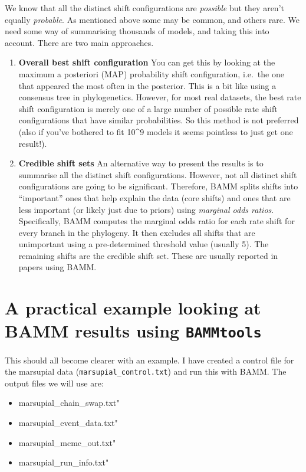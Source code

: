 \documentclass[]{book}
\providecommand{\tightlist}{%
  \setlength{\itemsep}{0pt}\setlength{\parskip}{0pt}}
\theoremstyle{definition}
\theoremstyle{definition}
\theoremstyle{definition}
\theoremstyle{remark}
\begin{document}
We know that all the distinct shift configurations are \emph{possible}
but they aren't equally \emph{probable}. As mentioned above some may be
common, and others rare. We need some way of summarising thousands of
models, and taking this into account. There are two main approaches.

\begin{enumerate}
\def\labelenumi{\arabic{enumi}.}
\item
  \textbf{Overall best shift configuration} You can get this by looking
  at the maximum a posteriori (MAP) probability shift configuration,
  i.e.~the one that appeared the most often in the posterior. This is a
  bit like using a consensus tree in phylogenetics. However, for most
  real datasets, the best rate shift configuration is merely one of a
  large number of possible rate shift configurations that have similar
  probabilities. So this method is not preferred (also if you've
  bothered to fit 10\^{}9 models it seems pointless to just get one
  result!).
\item
  \textbf{Credible shift sets} An alternative way to present the results
  is to summarise all the distinct shift configurations. However, not
  all distinct shift configurations are going to be significant.
  Therefore, BAMM splits shifts into ``important'' ones that help
  explain the data (core shifts) and ones that are less important (or
  likely just due to priors) using \emph{marginal odds ratios}.
  Specifically, BAMM computes the marginal odds ratio for each rate
  shift for every branch in the phylogeny. It then excludes all shifts
  that are unimportant using a pre-determined threshold value (usually
  5). The remaining shifts are the credible shift set. These are usually
  reported in papers using BAMM.
\end{enumerate}

\section{\texorpdfstring{A practical example looking at BAMM results
using
\texttt{BAMMtools}}{A practical example looking at BAMM results using BAMMtools}}\label{a-practical-example-looking-at-bamm-results-using-bammtools}

This should all become clearer with an example. I have created a control
file for the marsupial data (\texttt{marsupial\_control.txt}) and run
this with BAMM. The output files we will use are:

\begin{itemize}
\tightlist
\item
  marsupial\_chain\_swap.txt"\\
\item
  marsupial\_event\_data.txt"\\
\item
  marsupial\_mcmc\_out.txt"\\
\item
  marsupial\_run\_info.txt"
\end{itemize}
\end{document}
